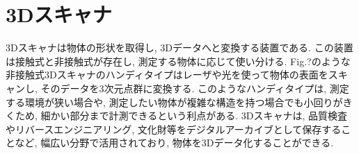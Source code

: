 \section{3Dスキャナ}
3Dスキャナは物体の形状を取得し, 3Dデータへと変換する装置である.
この装置は接触式と非接触式が存在し, 測定する物体に応じて使い分ける.
Fig.?のような非接触式3Dスキャナのハンディタイプはレーザや光を使って物体の表面をスキャンし, そのデータを3次元点群に変換する.
このようなハンディタイプは, 測定する環境が狭い場合や, 測定したい物体が複雑な構造を持つ場合でも小回りがきくため, 細かい部分まで計測できるという利点がある.
3Dスキャナは, 品質検査やリバースエンジニアリング, 文化財等をデジタルアーカイブとして保存することなど, 幅広い分野で活用されており, 物体を3Dデータ化することができる.
